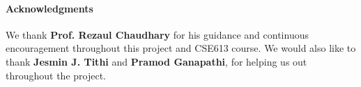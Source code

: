 \paragraph{Acknowledgments}
\label{ack}

%
%
%
%
%

We thank \textbf{Prof. Rezaul Chaudhary} for his guidance and continuous
encouragement throughout this project and CSE613 course.
We would also like to thank \textbf{Jesmin J. Tithi} and \textbf{Pramod Ganapathi},
for helping us out throughout the project.



